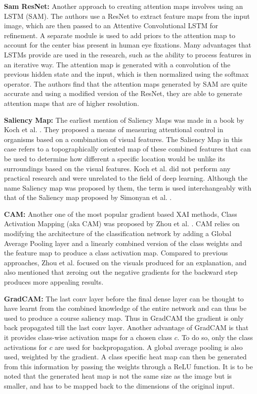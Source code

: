 \textbf{Sam ResNet: }
Another approach to creating attention maps involves using an LSTM \cite{corniaPredictingHumanEye2018} (SAM). The authors use a ResNet to extract feature maps from the input image, which are then passed to an Attentive Convolutional LSTM for refinement. A separate module is used to add priors to the attention map to account for the center bias present in human eye fixations. Many advantages that LSTMs provide are used in the research, such as the ability to process features in an iterative way. The attention map is generated with a convolution of the previous hidden state and the input, which is then normalized using the softmax operator. The authors find that the attention maps generated by SAM are quite accurate and using a modified version of the ResNet, they are able to generate attention maps that are of higher resolution.

\textbf{Saliency Map: } The earliest mention of Saliency Maps was made in a book by Koch et al. \cite{ullman1988attention}. They proposed a means of measuring attentional control in organisms based on a combination of visual features. The Saliency Map in this case refers to a topographically oriented map of these combined features that can be used to determine how different a specific location would be unlike its surroundings based on the visual features. Koch et al. did not perform any practical research and were unrelated to the field of deep learning. Although the name Saliency map was proposed by them, the term is used interchangeably with that of the Saliency map proposed by Simonyan et al. \cite{simonyanDeepConvolutionalNetworks2014}.

\textbf{CAM: } Another one of the most popular gradient based XAI methods, Class Activation Mapping (aka CAM) was proposed by Zhou et al. \cite{zhouLearningDeepFeatures2016}. CAM relies on modifying the architecture of the classification network by adding a Global Average Pooling layer and a linearly combined version of the class weights and the feature map to produce a class activation map. Compared to previous approaches, Zhou et al. focused on the visuals produced for an explanation, and also mentioned that zeroing out the negative gradients for the backward step produces more appealing results.

\textbf{GradCAM: } The last conv layer before the final dense layer can be thought to have learnt from the combined knowledge of the entire network and can thus be used to produce a course saliency map. Thus in GradCAM \cite{selvarajuGradCAMVisualExplanations} the gradient is only back propagated till the last conv layer. Another advantage of GradCAM is that it provides class-wise activation maps for a chosen class $c$. To do so, only the class activations for $c$ are used for backpropagation. A global average pooling is also used, weighted by the gradient. A class specific heat map can then be generated from this information by passing the weights through a ReLU function. It is to be noted that the generated heat map is not the same size as the image but is smaller, and has to be mapped back to the dimensions of the original input.

